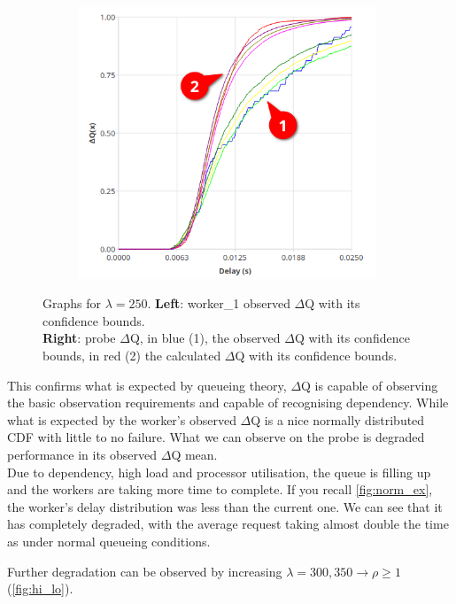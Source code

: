 \begin{figure}[H]
\begin{subfigure}{.5\textwidth}
                \includegraphics[width =0.98\textwidth]{img/overload_2/250_probe2.png}
                \label{fig:high_load_2}
            \end{subfigure}
            \caption{Graphs for $\lambda = 250$. \textbf{Left}: worker\_1 observed $\Delta$Q with its confidence bounds. \\
            \textbf{Right}: probe $\Delta$Q, in blue (1), the observed $\Delta$Q with its confidence bounds, in red (2) the calculated $\Delta$Q with its confidence bounds.}%
            \label{fig:early_ov}
        \end{figure} 
    This confirms what is expected by queueing theory, $\Delta$Q is capable of observing the basic observation requirements and capable of recognising dependency. While what is expected by the worker's observed $\Delta$Q is a nice normally distributed CDF with little to no failure. What we can observe on the probe is degraded performance in its observed $\Delta$Q mean. \\
    Due to dependency, high load and processor utilisation, the queue is filling up and the workers are taking more time to complete. If you recall \cref{fig:norm_ex}, the worker's delay distribution was less than the current one. We can see that it has completely degraded, with the average request taking almost double the time as under normal queueing conditions. 

    Further degradation can be observed by increasing $\lambda = {300, 350} \rightarrow \rho \ge 1$ (\cref{fig:hi_lo}).

